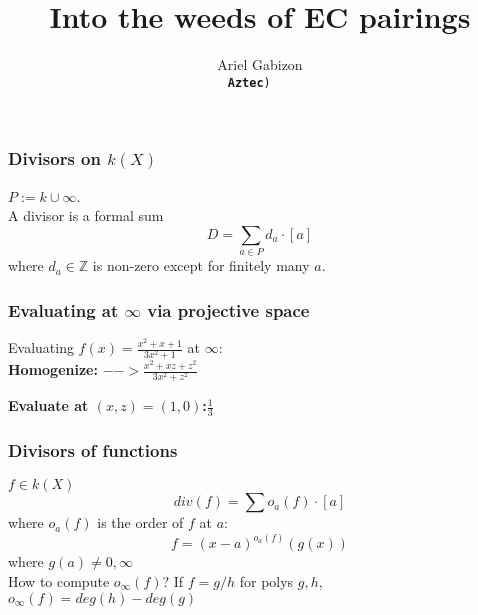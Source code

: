 \documentclass[shadesubsections,compress,14pt,mathserif]{beamer}
\title{\large{Into the weeds of EC pairings}}    %
\author{\small{Ariel Gabizon}\\                 %
\tt{\footnotesize{\textbf{Aztec})                                        } }      }%
\date{}                    %
\newcommand{\F}{\ensuremath{\mathbb F}}
\newcommand{\set}[1]{\ensuremath{\left\{#1\right\}}}
\newcommand{\defeq}{\ensuremath{:=}}
\newcommand{\ver}{\ensuremath{\mathcal{V}}}
\newcommand{\polysofdeg}[1]{\F_{< #1}[X]}
\newcommand{\ideal}{\mathbf{I}}
\begin{document}
\boldmath
\begin{frame}
  \titlepage
\end{frame}



\begin{frame}
\frametitle{Divisors on $k(X)$}   %

$P\defeq  k\cup\infty$.\pause \\ 
\vspace{0.2in}
A divisor is a formal sum
$$D=\sum_{a\in P}d_a \cdot [a]$$
where $d_a\in\mathbb{Z}$ is non-zero except for finitely many $a$.

% 
% 
% 
\end{frame}
\begin{frame}
\frametitle{Evaluating at $\infty$ via projective space}   

Evaluating $f(x)=\frac{x^2+x+1}{3x^2+1}$ at $\infty$:\\ \pause
\vspace{0.2in}
\textbf{Homogenize:} $--> \frac{x^2+xz+z^2}{3x^2+z^2}$ \\ \pause

\vspace{0.2in}
\textbf{Evaluate at $(x,z)=(1,0)$:}$\frac{1}{3}$
\end{frame}
\begin{frame}
\frametitle{Divisors of functions}   %

$f\in k(X)$
$$div(f)=\sum o_a(f)\cdot [a]$$
where $o_a(f)$ is the order of $f$ at $a$:\pause
$$f=(x-a)^{o_a(f)} (g(x))$$ 
where $g(a)\neq 0,\infty$ \\ \pause
\vspace{0.2in}
How to compute $o_{\infty}(f)$? If $f=g/h$ for polys $g,h$, $o_{\infty}(f) = deg(h)-deg(g)$


\end{frame}
\end{document}
